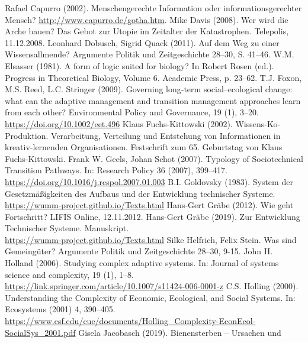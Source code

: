\documentclass[11pt,a4paper]{article}
\begin{document}
\begin{thebibliography}{xxx}
 Rafael Capurro (2002). Menschengerechte Information oder
  informationsgerechter Mensch? \url{http://www.capurro.de/gotha.htm}.
 Mike Davis (2008). Wer wird die Arche bauen?  Das Gebot
  zur Utopie im Zeitalter der Katastrophen.  Telepolis, 11.12.2008.
 Leonhard Dobusch, Sigrid Quack (2011). Auf dem Weg zu
  einer Wissensallmende? Argumente Politik und Zeitgeschichte 28--30,
  S. 41--46.
 W.M. Elsasser (1981). A form of logic suited for
  biology? In Robert Rosen (ed.). Progress in Theoretical Biology, Volume 6.
  Academic Press, p. 23--62.
 T.J. Foxon, M.S. Reed, L.C. Stringer (2009). Governing
  long‐term social–ecological change: what can the adaptive management and
  transition management approaches learn from each other? Environmental Policy
  and Governance, 19 (1), 3--20.\\ \url{https://doi.org/10.1002/eet.496}
 Klaus Fuchs-Kittowski (2002). Wissens-Ko-Produktion.
  Verarbeitung, Verteilung und Entstehung von Informationen in
  kreativ-lernenden Organisationen.  Festschrift zum 65. Geburtstag von Klaus
  Fuchs-Kittowski.
 Frank W. Geels, Johan Schot (2007). Typology of
  Sociotechnical Transition Pathways. In: Research Policy 36 (2007),
  399–417.\\ \url{https://doi.org/10.1016/j.respol.2007.01.003}
 B.I. Goldovsky (1983). System der Gesetzmäßigkeiten
  des Aufbaus und der Entwicklung technischer Systeme.
  \url{https://wumm-project.github.io/Texts.html}
 Hans-Gert Gräbe (2012). Wie geht Fortschritt? LIFIS
  Online, 12.11.2012.
 Hans-Gert Gräbe (2019). Zur Entwicklung Technischer
  Systeme.  Manuskript. \\ \url{https://wumm-project.github.io/Texts.html}
 Silke Helfrich, Felix Stein. Was sind Gemeingüter?
  Argumente Politik und Zeitgeschichte 28--30, 9-15.
 John H. Holland (2006). Studying complex adaptive
  systems. In: Journal of systems science and complexity, 19 (1),
  1–8.\\ \url{https://link.springer.com/article/10.1007/s11424-006-0001-z}
 C.S. Holling (2000). Understanding the Complexity of
  Economic, Ecological, and Social Systems. In: Ecosystems (2001) 4, 390–405.
  \url{https://www.esf.edu/cue/documents/Holling_Complexity-EconEcol-SocialSys_2001.pdf}
 Gisela Jacobasch (2019). Bienensterben -- Ursachen und

\end{thebibliography}
\end{document}
